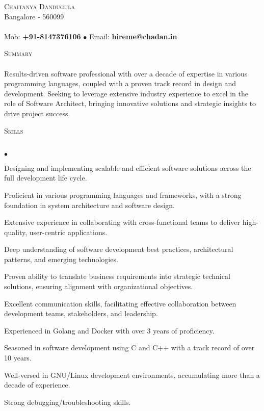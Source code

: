 \documentclass[a4paper]{article}
\newcommand{\lineunder}{\vspace*{-8pt} \\ \hspace*{-18pt} \hrulefill \\}
\newcommand{\header}[1]{{\hspace*{-15pt}\vspace*{6pt} \textsc{#1}} \vspace*{-6pt} \lineunder}
\newcommand{\contact}[3]{
\vspace*{-8pt}
\begin{center}
{\LARGE \scshape {#1}}\\
#2 \lineunder
#3
\end{center}
\vspace*{-8pt}
}
\newenvironment{achievements}{\begin{list}{$\bullet$}{\topsep 0pt \itemsep -2pt}}{\vspace*{4pt}\end{list}}
\begin{document}
\small
\smallskip
\contact{Chaitanya Dandugula}
{Bangalore - 560099}
{Mob: \textbf{+91-8147376106} $\bullet$ Email: \textbf{hireme@chadan.in}}
\vspace*{5pt}

\header{Summary}
Results-driven software professional with over a decade of expertise in various programming languages, coupled with a proven track record in design and development. Seeking to leverage extensive industry experience to excel in the role of Software Architect, bringing innovative solutions and strategic insights to drive project success.

\header{Skills}
\begin{achievements}
\item Designing and implementing scalable and efficient software solutions across the full development life cycle.
\item Proficient in various programming languages and frameworks, with a strong foundation in system architecture and software design.
\item Extensive experience in collaborating with cross-functional teams to deliver high-quality, user-centric applications.
\item Deep understanding of software development best practices, architectural patterns, and emerging technologies.
\item Proven ability to translate business requirements into strategic technical solutions, ensuring alignment with organizational objectives.
\item Excellent communication skills, facilitating effective collaboration between development teams, stakeholders, and leadership.
\item Experienced in Golang and Docker with over 3 years of proficiency.
\item Seasoned in software development using C and C++ with a track record of over 10 years.
\item Well-versed in GNU/Linux development environments, accumulating more than a decade of experience.
\item Strong debugging/troubleshooting skills.
\end{achievements}
\end{document}
